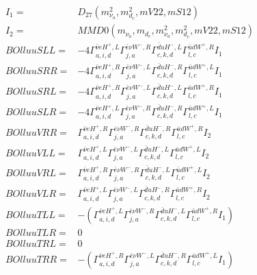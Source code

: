 \documentclass[A4,landscape]{article}
\begin{document}
\begin{align} 
I_1 = & D_{27}(m^2_{\nu_{{a}}}, m^2_{d_{{c}}}, mV22, mS12) \\ 
I_2 = & MMD0(m_{\nu_{{a}}}, m_{d_{{c}}}, m^2_{\nu_{{a}}}, m^2_{d_{{c}}}, mV22, mS12) \\ 
  BOlluuSLL= & -4  \Gamma^{\bar{\nu}e H^+,L}_{a, i, d} \Gamma^{\bar{e}\nu W^- ,R}_{j, a} \Gamma^{\bar{d}u H^- ,L}_{c, k, d} \Gamma^{\bar{u}d W^+,R}_{l, c} I_1 \\ 
  BOlluuSRR= & -4  \Gamma^{\bar{\nu}e H^+,R}_{a, i, d} \Gamma^{\bar{e}\nu W^- ,L}_{j, a} \Gamma^{\bar{d}u H^- ,R}_{c, k, d} \Gamma^{\bar{u}d W^+,L}_{l, c} I_1 \\ 
  BOlluuSRL= & -4  \Gamma^{\bar{\nu}e H^+,R}_{a, i, d} \Gamma^{\bar{e}\nu W^- ,L}_{j, a} \Gamma^{\bar{d}u H^- ,L}_{c, k, d} \Gamma^{\bar{u}d W^+,R}_{l, c} I_1 \\ 
  BOlluuSLR= & -4  \Gamma^{\bar{\nu}e H^+,L}_{a, i, d} \Gamma^{\bar{e}\nu W^- ,R}_{j, a} \Gamma^{\bar{d}u H^- ,R}_{c, k, d} \Gamma^{\bar{u}d W^+,L}_{l, c} I_1 \\ 
  BOlluuVRR= &  \Gamma^{\bar{\nu}e H^+,R}_{a, i, d} \Gamma^{\bar{e}\nu W^- ,R}_{j, a} \Gamma^{\bar{d}u H^- ,R}_{c, k, d} \Gamma^{\bar{u}d W^+,R}_{l, c} I_2 \\ 
  BOlluuVLL= &  \Gamma^{\bar{\nu}e H^+,L}_{a, i, d} \Gamma^{\bar{e}\nu W^- ,L}_{j, a} \Gamma^{\bar{d}u H^- ,L}_{c, k, d} \Gamma^{\bar{u}d W^+,L}_{l, c} I_2 \\ 
  BOlluuVRL= &  \Gamma^{\bar{\nu}e H^+,R}_{a, i, d} \Gamma^{\bar{e}\nu W^- ,R}_{j, a} \Gamma^{\bar{d}u H^- ,L}_{c, k, d} \Gamma^{\bar{u}d W^+,L}_{l, c} I_2 \\ 
  BOlluuVLR= &  \Gamma^{\bar{\nu}e H^+,L}_{a, i, d} \Gamma^{\bar{e}\nu W^- ,L}_{j, a} \Gamma^{\bar{d}u H^- ,R}_{c, k, d} \Gamma^{\bar{u}d W^+,R}_{l, c} I_2 \\ 
  BOlluuTLL= & -( \Gamma^{\bar{\nu}e H^+,L}_{a, i, d} \Gamma^{\bar{e}\nu W^- ,R}_{j, a} \Gamma^{\bar{d}u H^- ,L}_{c, k, d} \Gamma^{\bar{u}d W^+,R}_{l, c} I_1) \\ 
  BOlluuTLR= & 0 \\ 
  BOlluuTRL= & 0 \\ 
  BOlluuTRR= & -( \Gamma^{\bar{\nu}e H^+,R}_{a, i, d} \Gamma^{\bar{e}\nu W^- ,L}_{j, a} \Gamma^{\bar{d}u H^- ,R}_{c, k, d} \Gamma^{\bar{u}d W^+,L}_{l, c} I_1) \\ 
\end{align} 
\end{document}

